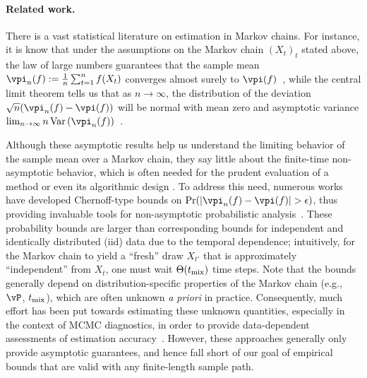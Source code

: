 \paragraph{Related work.}
There is a vast statistical literature on estimation in Markov chains.
For instance, it is know that under the assumptions on the Markov
chain $(X_t)_t$ stated above, the law of large numbers guarantees that
the sample mean $\vpi_n(f) \defeq \frac1n \sum_{t=1}^n f(X_t)$
converges almost surely to $\vpi(f)$~\cite{meyn1993markov}, while the
central limit theorem tells us that as $n\to \infty$, the distribution
of the deviation $\sqrt{n}( \vpi_n(f)-\vpi(f))$ will be normal with
mean zero and asymptotic variance $\lim_{n\to\infty}
n\Var\Parens{\vpi_n(f)}$~\cite{kipnis1986central}.

Although these asymptotic results help us understand the limiting
behavior of the sample mean over a Markov chain, they say little about
the finite-time non-asymptotic behavior, which is often needed for the
prudent evaluation of a method or even its algorithmic design
\cite{
MCMCDiscussion93%
,DBLP:conf/valuetools/KontoyiannisLM06%
,BBL06%
,MniSzeAu08%
,MauPo09%
,LiLiWaSt11:KWIK%
,flegal2011implementing%
,Gyori-paulin15%
,SwaJoa15:LoggedBandit%
}. %
To address this need, numerous works have developed Chernoff-type
bounds on $\Pr\parens{ |\vpi_n(f)-\vpi(f)| > \eps }$, thus providing
invaluable tools for non-asymptotic probabilistic
analysis~\cite{gillman1998chernoff,leon2004optimal,DBLP:conf/valuetools/KontoyiannisLM06,paulin15}.
These probability bounds are larger than corresponding bounds for
independent and identically distributed (iid) data due to the temporal
dependence; intuitively, for the Markov chain to yield a ``fresh''
draw $X_{t'}$ that is approximately ``independent'' from $X_t$, one
must wait $\Theta(t_{\operatorname{mix}})$ time steps.
Note that the bounds generally depend on distribution-specific
properties of the Markov chain (e.g., $\vP$, $t_{\operatorname{mix}}$), which are often
unknown \emph{a priori} in practice.
Consequently, much effort has been put towards estimating these
unknown quantities, especially in the context of MCMC diagnostics, in
order to provide data-dependent assessments of estimation
accuracy~\cite[e.g.,][]{MCMCDiscussion93,flegal2011implementing,1209.0703,Gyori-paulin15}.
However, these approaches generally only provide asymptotic
guarantees, and hence fall short of our goal of empirical bounds that
are valid with any finite-length sample path.

